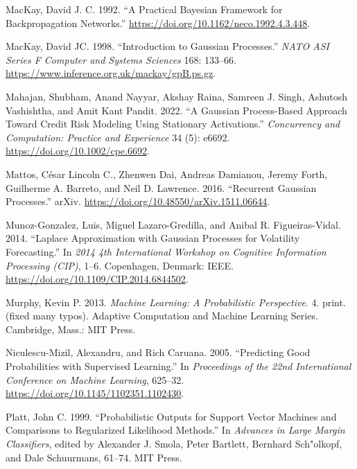 \documentclass[
  letterpaper,
  DIV=11,
  numbers=noendperiod]{scrartcl}
\newlength{\cslhangindent}
\newenvironment{CSLReferences}[2] %
 {\begin{list}{}{%
  \setlength{\itemindent}{0pt}
  \setlength{\leftmargin}{0pt}
  \setlength{\parsep}{0pt}
  \ifodd #1
   \setlength{\leftmargin}{\cslhangindent}
   \setlength{\itemindent}{-1\cslhangindent}
  \fi
  \setlength{\itemsep}{#2\baselineskip}}}
 {\end{list}}
\begin{document}
\begin{CSLReferences}{1}{0}
MacKay, David J. C. 1992. {``A Practical {Bayesian} Framework for
Backpropagation Networks.''}
\url{https://doi.org/10.1162/neco.1992.4.3.448}.

MacKay, David JC. 1998. {``Introduction to {Gaussian} Processes.''}
\emph{NATO ASI Series F Computer and Systems Sciences} 168: 133--66.
\url{https://www.inference.org.uk/mackay/gpB.ps.gz}.

Mahajan, Shubham, Anand Nayyar, Akshay Raina, Samreen J. Singh, Ashutosh
Vashishtha, and Amit Kant Pandit. 2022. {``A {Gaussian} Process-Based
Approach Toward Credit Risk Modeling Using Stationary Activations.''}
\emph{Concurrency and Computation: Practice and Experience} 34 (5):
e6692. \url{https://doi.org/10.1002/cpe.6692}.

Mattos, César Lincoln C., Zhenwen Dai, Andreas Damianou, Jeremy Forth,
Guilherme A. Barreto, and Neil D. Lawrence. 2016. {``Recurrent
{Gaussian} {Processes}.''} arXiv.
\url{https://doi.org/10.48550/arXiv.1511.06644}.

Munoz-Gonzalez, Luis, Miguel Lazaro-Gredilla, and Anibal R.
Figueiras-Vidal. 2014. {``Laplace Approximation with {Gaussian}
{Processes} for Volatility Forecasting.''} In \emph{2014 4th
{International} {Workshop} on {Cognitive} {Information} {Processing}
({CIP})}, 1--6. Copenhagen, Denmark: IEEE.
\url{https://doi.org/10.1109/CIP.2014.6844502}.

Murphy, Kevin P. 2013. \emph{Machine Learning: A Probabilistic
Perspective}. 4. print. (fixed many typos). Adaptive Computation and
Machine Learning Series. Cambridge, Mass.: MIT Press.

Niculescu-Mizil, Alexandru, and Rich Caruana. 2005. {``Predicting Good
Probabilities with Supervised Learning.''} In \emph{Proceedings of the
22nd International Conference on Machine Learning}, 625--32.
\url{https://doi.org/10.1145/1102351.1102430}.

Platt, John C. 1999. {``Probabilistic Outputs for Support Vector
Machines and Comparisons to Regularized Likelihood Methods.''} In
\emph{Advances in Large Margin Classifiers}, edited by Alexander J.
Smola, Peter Bartlett, Bernhard Sch"olkopf, and Dale Schuurmans, 61--74.
MIT Press.


\end{CSLReferences}
\end{document}
